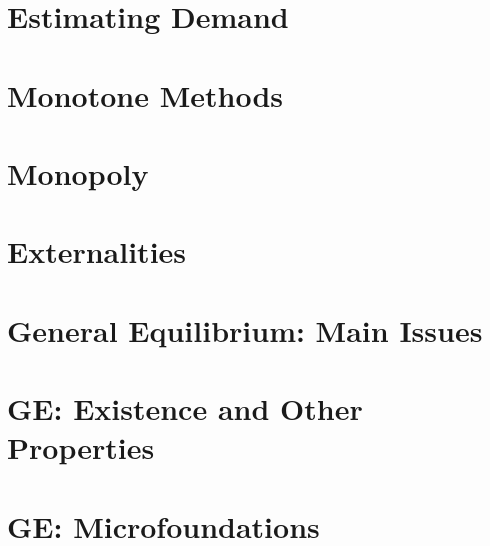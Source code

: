 \documentclass{article}
\begin{document}



\newpage

\section{Estimating Demand}
\label{sec:estimating-demand}



\newpage

\section{Monotone Methods}
\label{sec:monotone-methods}



\newpage

\section{Monopoly}
\label{sec:monopoly}



\newpage

\section{Externalities}
\label{sec:externalities}



\newpage

\section{General Equilibrium: Main Issues}
\label{sec:main-issues}



\newpage

\section{GE: Existence and Other Properties}
\label{sec:exist-other-prop}



\newpage

\section{GE: Microfoundations}
\label{sec:microfoundations}
\end{document}
